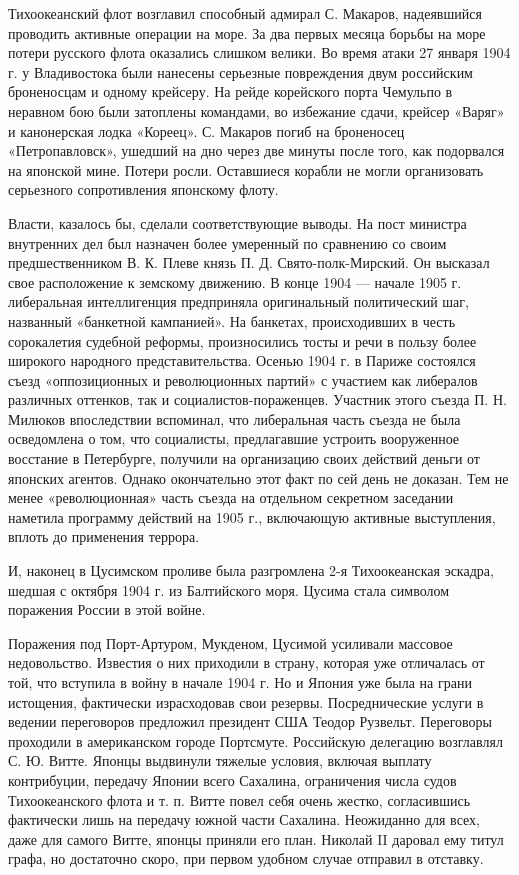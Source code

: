 \documentclass[12pt]{article}
\begin{document}
Тихоокеанский флот возглавил способный адмирал С. Макаров, надеявшийся проводить активные операции на море. За два первых месяца борьбы на море потери русского флота оказались слишком велики. Во время атаки 27 января 1904 г. у Владивостока были нанесены серьезные повреждения двум российским броненосцам и одному крейсеру. На рейде корейского порта Чемульпо в неравном бою были затоплены командами, во избежание сдачи, крейсер «Варяг» и канонерская лодка «Кореец». С. Макаров погиб на броненосец «Петропавловск», ушедший на дно через две минуты после того, как подорвался на японской мине. Потери росли. Оставшиеся корабли не могли организовать серьезного сопротивления японскому флоту.

Власти, казалось бы, сделали соответствующие выводы. На пост министра внутренних дел был назначен  более  умеренный  по  сравнению  со  своим предшественником В. К. Плеве князь П. Д. Свято-полк-Мирский. Он высказал свое расположение к земскому   движению.   В   конце   1904   —   начале 1905  г.  либеральная интеллигенция предприняла оригинальный политический шаг, названный «банкетной кампанией». На банкетах, происходивших в честь  сорокалетия  судебной реформы,  произносились тосты и речи в пользу более широкого народного представительства. Осенью 1904 г. в Париже состоялся съезд «оппозиционных и революционных партий» с участием как либералов различных оттенков, так и социалистов-пораженцев.    Участник    этого    съезда П. Н. Милюков впоследствии вспоминал, что либеральная часть съезда не была осведомлена о том, что социалисты,   предлагавшие   устроить   вооруженное восстание в Петербурге,  получили на организацию своих действий деньги от японских агентов. Однако окончательно этот факт по сей день не доказан. Тем не менее «революционная» часть съезда на отдельном секретном заседании наметила программу действий на  1905 г.,  включающую активные выступления, вплоть до применения террора.

И, наконец в Цусимском проливе была разгромлена 2-я Тихоокеанская эскадра, шедшая с октября 1904 г. из Балтийского моря. Цусима стала символом поражения России в этой войне.

Поражения под Порт-Артуром, Мукденом, Цусимой усиливали массовое недовольство. Известия о них приходили в страну, которая уже отличалась от той, что вступила в войну в начале 1904 г.  Но и Япония уже была на грани истощения, фактически израсходовав свои резервы. Посреднические услуги в ведении переговоров предложил президент США Теодор Рузвельт. Переговоры проходили в американском городе Портсмуте. Российскую делегацию возглавлял С. Ю. Витте. Японцы выдвинули тяжелые условия, включая выплату контрибуции, передачу Японии всего Сахалина, ограничения числа судов Тихоокеанского флота и т. п. Витте повел себя очень жестко, согласившись фактически лишь на передачу южной части Сахалина. Неожиданно для всех, даже для самого Витте, японцы приняли его план. Николай II даровал ему титул графа, но достаточно скоро, при первом удобном случае отправил в отставку.
\end{document}
